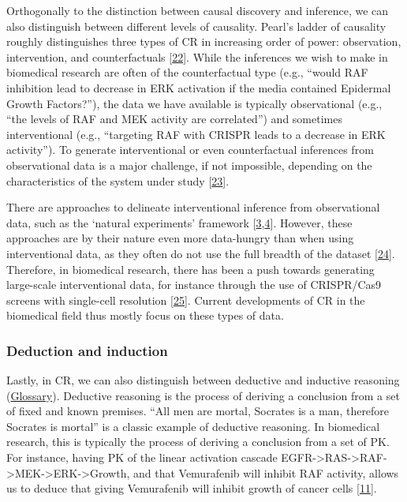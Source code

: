 Orthogonally to the distinction between causal discovery and inference, we can also distinguish between different levels of causality.
Pearl's ladder of causality roughly distinguishes three types of CR in increasing order of power: observation, intervention, and counterfactuals {[}\protect\hyperlink{ref-185mDnD0M}{22}{]}.
While the inferences we wish to make in biomedical research are often of the counterfactual type (e.g., ``would RAF inhibition lead to decrease in ERK activation if the media contained Epidermal Growth Factors?''), the data we have available is typically observational (e.g., ``the levels of RAF and MEK activity are correlated'') and sometimes interventional (e.g., ``targeting RAF with CRISPR leads to a decrease in ERK activity'').
To generate interventional or even counterfactual inferences from observational data is a major challenge, if not impossible, depending on the characteristics of the system under study {[}\protect\hyperlink{ref-dJUlTjFg}{23}{]}.

There are approaches to delineate interventional inference from observational data, such as the `natural experiments' framework {[}\protect\hyperlink{ref-w47lt0ah}{3},\protect\hyperlink{ref-712MuGug}{4}{]}.
However, these approaches are by their nature even more data-hungry than when using interventional data, as they often do not use the full breadth of the dataset {[}\protect\hyperlink{ref-1A5MoTSGF}{24}{]}.
Therefore, in biomedical research, there has been a push towards generating large-scale interventional data, for instance through the use of CRISPR/Cas9 screens with single-cell resolution {[}\protect\hyperlink{ref-152yKY5w7}{25}{]}.
Current developments of CR in the biomedical field thus mostly focus on these types of data.

\hypertarget{deduction-and-induction}{%
\subsubsection{Deduction and induction}\label{deduction-and-induction}}

Lastly, in CR, we can also distinguish between deductive and inductive reasoning (\protect\hyperlink{deductive-vs.-inductive-reasoning}{Glossary}).
Deductive reasoning is the process of deriving a conclusion from a set of fixed and known premises.
``All men are mortal, Socrates is a man, therefore Socrates is mortal'' is a classic example of deductive reasoning.
In biomedical research, this is typically the process of deriving a conclusion from a set of PK.
For instance, having PK of the linear activation cascade EGFR-\textgreater RAS-\textgreater RAF-\textgreater MEK-\textgreater ERK-\textgreater Growth, and that Vemurafenib will inhibit RAF activity, allows us to deduce that giving Vemurafenib will inhibit growth of cancer cells {[}\protect\hyperlink{ref-muFRX2ZL}{11}{]}.


